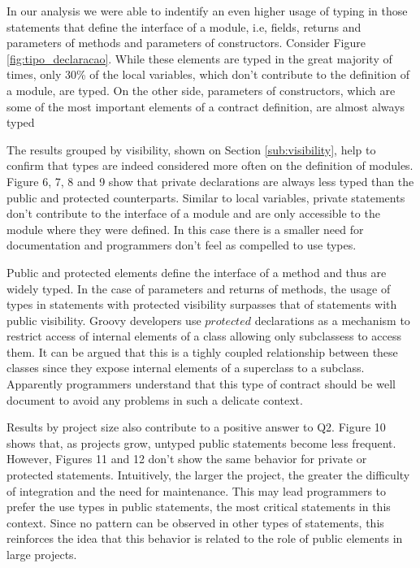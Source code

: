 \documentclass[preprint]{sigplanconf}
\begin{document}
In our analysis we were able to indentify an even higher usage of typing in those statements that define the interface of a module, i.e, fields, returns and parameters of methods and parameters of constructors.
Consider Figure \ref{fig:tipo_declaracao}.
While these elements are typed in the great majority of times, only 30\%  of the local variables, which don't contribute to the definition of a module, are typed. On the other side, parameters of constructors, which are some of the most important elements of a contract definition, are almost always typed

The results grouped by visibility, shown on Section \ref{sub:visibility}, help to confirm that types are indeed considered more often on the definition of modules.
Figure 6, 7, 8 and 9 show that private declarations are always less typed than the public and protected counterparts.
Similar to local variables, private statements don't contribute to the interface of a module and are only accessible to the module where they were defined.
In this case there is a smaller need for documentation and programmers don't feel as compelled to use types.

Public and protected elements define the interface of a method and thus are widely typed.
In the case of parameters and returns of methods, the usage of types in statements with protected visibility  surpasses that of statements with public visibility.
Groovy developers use $protected$ declarations as a mechanism to restrict access of internal elements of a class allowing only subclassess to access them.
It can be argued that this is a tighly coupled relationship between these classes \cite{Eder94} since they expose internal elements of a superclass to a subclass.
Apparently programmers understand that this type of contract should be well document to avoid any problems in such a delicate context.

Results by project size also contribute to a positive answer to Q2.
Figure 10 shows that, as projects grow, untyped public statements become less frequent.
However, Figures 11 and 12 don't show the same behavior for private or protected statements.
Intuitively, the larger the project, the greater the difficulty of integration and the need for maintenance.
This may lead programmers to prefer the use types in public statements, the most critical  statements in this context.
Since no pattern can be observed in other types of statements, this reinforces the idea that this behavior is related to the role of public elements in large projects.
\end{document}
